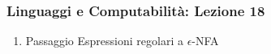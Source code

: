 




\begin{frame}[fragile]
	\frametitle{Linguaggi e Computabilità: Lezione 18}
\begin{enumerate}
\item
Passaggio Espressioni regolari a $\epsilon$-NFA
\end{enumerate}
\end{frame}



